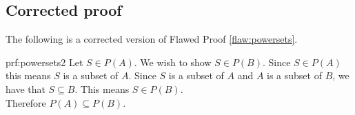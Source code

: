 \clearpage
\subsection{Corrected proof}

The following is a corrected version of Flawed Proof \ref{flaw:powersets}. %

\begin{prf}{prf:powersets2} %
Let $S \in P(A)$. We wish to show $S \in P(B)$. Since $S \in P(A)$ this means $S$ is a subset of $A$. Since $S$ is a subset of $A$ and $A$ is a subset of $B$, we have that $S \subseteq B$. This means $S \in P(B)$. \\

Therefore $P(A) \subseteq P(B)$. 
\end{prf}